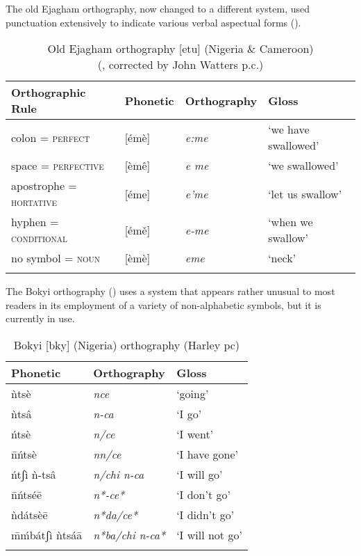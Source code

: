 \documentclass[output=paper]{langscibook}
\begin{document}
The old Ejagham orthography, now changed to a different system, used punctuation extensively to indicate various verbal aspectual forms ().

    \begin{table}
        \begin{tabularx}{\textwidth}{llXl}
            \lsptoprule
            Orthographic Rule & Phonetic & Orthography & Gloss\\\midrule
            colon =  \textsc{perfect} & [émè] & \textit{e:me} & ‘we have swallowed’\\
            space =  \textsc{perfective} & [èmê] & \textit{e me} & ‘we swallowed’\\
            apostrophe = \textsc{hortative} & [éme] & \textit{e’me} & ‘let us swallow’\\
            hyphen =   \textsc{conditional} & [émě] & \textit{e-me} & ‘when we swallow’\\
            no symbol =  \textsc{noun} & [èmè] & \textit{eme} & ‘neck’\\
            \lspbottomrule
        \end{tabularx}
        \caption{Old Ejagham orthography [etu] (Nigeria \& Cameroon)\\
             (\citealt{Bird1999b}, corrected by John Watters p.c.)\label{tab:cahill:fiaghamOrtho:13}}
    \end{table}
    
The Bokyi orthography () uses a system that appears rather unusual to most readers in its employment of a variety of non-alphabetic symbols, but it is currently in use.


    \begin{table}
        \begin{tabularx}{\textwidth}{XXX}
        \lsptoprule
        Phonetic & Orthography & Gloss\\\midrule
        ǹtsè & \textit{nce} & ‘going’\\
        ǹtsâ & \textit{n-ca}  & ‘I go’\\
        ńtsè & \textit{n/ce}  & ‘I went’  \\
        \={n}ńtsè & \textit{nn/ce} & ‘I have gone’\\
        ńtʃì ǹ-tsâ & \textit{n/chi  n-ca} & ‘I will go’\\
        \={n}ńtséē & \textit{n*-ce*} & ‘I don't go’\\
        ǹdátsèē & \textit{n*da/ce*}  & ‘I didn't go’\\
        \={m}ḿbátʃì ǹtsáā & \textit{n*ba/chi  n-ca*} & ‘I will not go’  \\
        \lspbottomrule
        \end{tabularx}
        \caption{Bokyi [bky] (Nigeria) orthography (Harley pc)\label{tab:cahill:BokyiOrtho:14}}
    \end{table}
\end{document}
